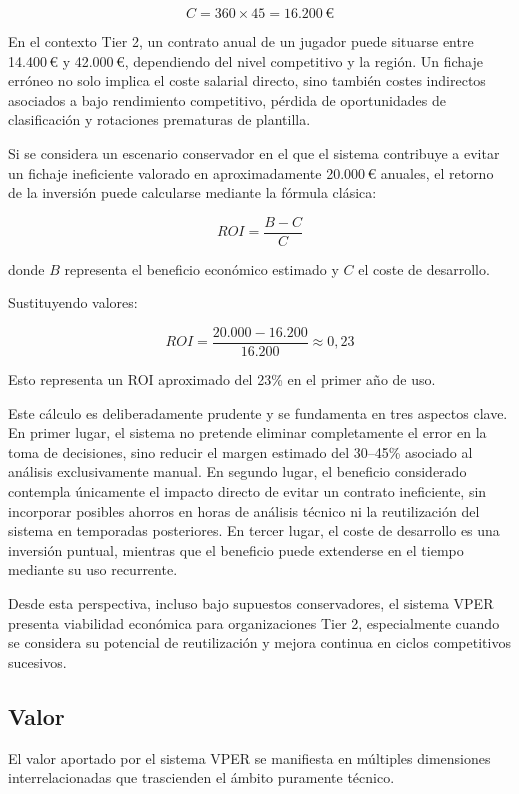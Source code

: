 \documentclass{ULBreport} %
\begin{document}
\[
C = 360 \times 45 = 16.200\,€
\]

En el contexto Tier 2, un contrato anual de un jugador puede situarse entre 14.400\,€ y 42.000\,€, dependiendo del nivel competitivo y la región. Un fichaje erróneo no solo implica el coste salarial directo, sino también costes indirectos asociados a bajo rendimiento competitivo, pérdida de oportunidades de clasificación y rotaciones prematuras de plantilla.

Si se considera un escenario conservador en el que el sistema contribuye a evitar un fichaje ineficiente valorado en aproximadamente 20.000\,€ anuales, el retorno de la inversión puede calcularse mediante la fórmula clásica:

\[
ROI = \frac{B - C}{C}
\]

donde $B$ representa el beneficio económico estimado y $C$ el coste de desarrollo.

Sustituyendo valores:

\[
ROI = \frac{20.000 - 16.200}{16.200} \approx 0{,}23
\]

Esto representa un ROI aproximado del 23\% en el primer año de uso.

Este cálculo es deliberadamente prudente y se fundamenta en tres aspectos clave. En primer lugar, el sistema no pretende eliminar completamente el error en la toma de decisiones, sino reducir el margen estimado del 30--45\% asociado al análisis exclusivamente manual. En segundo lugar, el beneficio considerado contempla únicamente el impacto directo de evitar un contrato ineficiente, sin incorporar posibles ahorros en horas de análisis técnico ni la reutilización del sistema en temporadas posteriores. En tercer lugar, el coste de desarrollo es una inversión puntual, mientras que el beneficio puede extenderse en el tiempo mediante su uso recurrente.

Desde esta perspectiva, incluso bajo supuestos conservadores, el sistema VPER presenta viabilidad económica para organizaciones Tier 2, especialmente cuando se considera su potencial de reutilización y mejora continua en ciclos competitivos sucesivos.

\subsection{Valor}

El valor aportado por el sistema VPER se manifiesta en múltiples dimensiones interrelacionadas que trascienden el ámbito puramente técnico.
\end{document}
